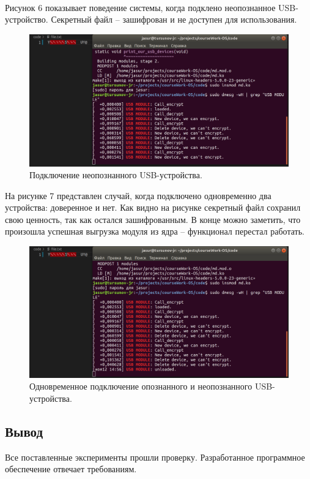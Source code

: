 \documentclass[a4paper, 10pt]{article}
\begin{document}
	\\ \hspace*{5mm} Рисунок 6 показывает поведение системы, когда подклено неопознанное USB-устройство. Секретный файл -- зашифрован и не доступен для использования.
	\clearpage
	\newpage
	\begin{figure}[h!]
		\centering
		\includegraphics[scale=0.2]{4}
		\centering\caption{Подключение неопознанного USB-устройства.}
	\end{figure}
	\hspace*{5mm} На рисунке 7 представлен случай, когда подключено одновременно два устройства: доверенное и нет. Как видно на рисунке секретный файл сохранил свою ценность, так как остался зашифрованным. В конце можно заметить, что произошла успешная выгрузка модуля из ядра -- функционал перестал работать. 
	\begin{figure}[h!]
		\centering
		\includegraphics[scale=0.2]{5}
		\centering\caption{Одновременное подключение опознанного и неопознанного USB-устройства.}
	\end{figure}
	\subsection{Вывод}
	Все поставленные эксперименты прошли проверку. Разработанное программное обеспечение отвечает требованиям.
	\clearpage
\end{document}
